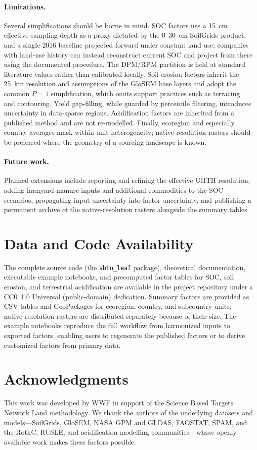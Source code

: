 \documentclass[11pt]{article}
\begin{document}
\paragraph{Limitations.} Several simplifications should be borne in mind. SOC factors use
a 15~cm effective sampling depth as a proxy dictated by the 0--30~cm SoilGrids product,
and a single 2016 baseline projected forward under constant land use; companies with
land-use history can instead reconstruct current SOC and project from there using the
documented procedure. The DPM/RPM partition is held at standard literature values rather
than calibrated locally. Soil-erosion factors inherit the 25~km resolution and
assumptions of the GloSEM base layers and adopt the common $P=1$ simplification, which
omits support practices such as terracing and contouring. Yield gap-filling, while
guarded by percentile filtering, introduces uncertainty in data-sparse regions.
Acidification factors are inherited from a published method and are not re-modelled.
Finally, ecoregion and especially country averages mask within-unit heterogeneity;
native-resolution rasters should be preferred where the geometry of a sourcing landscape
is known.

\paragraph{Future work.} Planned extensions include reporting and refining the effective
UHTH resolution, adding farmyard-manure inputs and additional commodities to the SOC
scenarios, propagating input uncertainty into factor uncertainty, and publishing a
permanent archive of the native-resolution rasters alongside the summary tables.

\section{Data and Code Availability}
\label{sec:availability}
The complete source code (the \texttt{sbtn\_leaf} package), theoretical documentation,
executable example notebooks, and precomputed factor tables for SOC, soil erosion, and
terrestrial acidification are available in the project repository under a CC0~1.0
Universal (public-domain) dedication. Summary factors are provided as CSV tables and
GeoPackages for ecoregion, country, and subcountry units; native-resolution rasters are
distributed separately because of their size. The example notebooks reproduce the full
workflow from harmonized inputs to exported factors, enabling users to regenerate the
published factors or to derive customized factors from primary data.

\section*{Acknowledgments}
This work was developed by WWF in support of the Science Based Targets Network Land
methodology. We thank the authors of the underlying datasets and models---SoilGrids,
GloSEM, NASA GPM and GLDAS, FAOSTAT, SPAM, and the RothC, RUSLE, and acidification
modelling communities---whose openly available work makes these factors possible.



\end{document}
